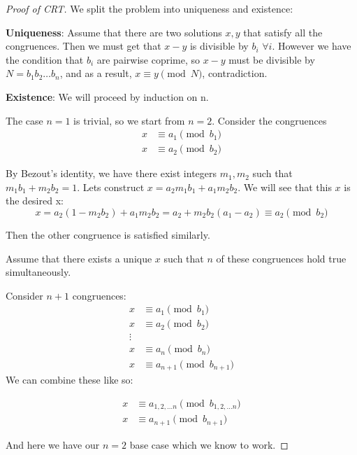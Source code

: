 \documentclass{article}
\theoremstyle{mytheoremstyle}
\theoremstyle{mytheoremstyle}
\theoremstyle{myproblemstyle}
\begin{document}
    \begin{proof}[Proof of CRT]

        We split the problem into uniqueness and existence:

        \textbf{Uniqueness}: Assume that there are two solutions $x, y$ that satisfy all the congruences. Then we must get that $x-y$ is divisible by $b_i$ $\forall i$. However we have the condition that $b_i$ are pairwise coprime, so $x-y$ must be divisible by $N = b_1b_2 \ldots b_n$, and as a result, $x \equiv y \pmod{N}$, contradiction.

        \textbf{Existence}: We will proceed by induction on n. 

        The case $n=1$ is trivial, so we start from $n=2$. Consider the congruences 
        \begin{align*}
            x &\equiv a_1 \pmod{b_1} \\
            x &\equiv a_2 \pmod{b_2}
        \end{align*}

        By Bezout's identity, we have there exist integers $m_1, m_2$ such that $m_1b_1 + m_2b_2 = 1$. Lets construct $x = a_2m_1b_1 + a_1m_2b_2$. We will see that this $x$ is the desired x: 
        \[x = a_2(1-m_2b_2) + a_1m_2b_2 = a_2 + m_2b_2(a_1 - a_2) \equiv a_2 \pmod{b_2}\]

        Then the other congruence is satisfied similarly. 

        Assume that there exists a unique $x$ such that $n$ of these congruences hold true simultaneously. 

        Consider $n+1$ congruences:
        \begin{align*}
            x &\equiv a_1 \pmod{b_1} \\
            x &\equiv a_2 \pmod{b_2} \\ 
            \vdots \\
            x &\equiv a_n \pmod{b_n} \\ 
            x &\equiv a_{n+1} \pmod{b_{n+1}}
        \end{align*}
        We can combine these like so: 

        \begin{align*}
            x &\equiv a_{1, 2, \ldots n} \pmod{b_{1, 2, \ldots n}} \\
            x &\equiv a_{n+1} \pmod{b_{n+1}}
        \end{align*}

        And here we have our $n=2$ base case which we know to work.




        
    \end{proof}
\end{document}

